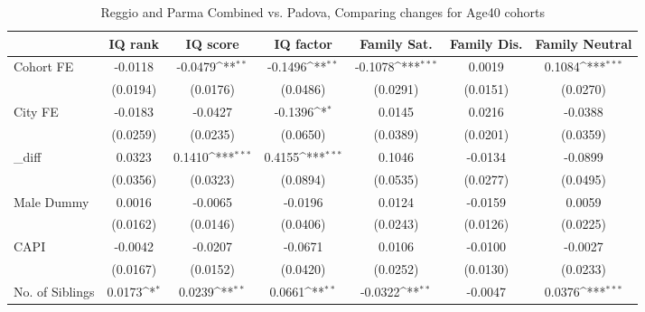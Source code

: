 \begin{table}[htbp]\centering
\def\sym#1{\ifmmode^{#1}\else\(^{#1}\)\fi}
\caption{Reggio and Parma Combined vs. Padova, Comparing changes for Age40 cohorts}
\begin{tabular}{l*{6}{c}}
\toprule
            &\multicolumn{1}{c}{IQ rank}&\multicolumn{1}{c}{IQ score}&\multicolumn{1}{c}{IQ factor}&\multicolumn{1}{c}{Family Sat.}&\multicolumn{1}{c}{Family Dis.}&\multicolumn{1}{c}{Family Neutral}\\
\midrule
Cohort FE   &     -0.0118         &     -0.0479\sym{**} &     -0.1496\sym{**} &     -0.1078\sym{***}&      0.0019         &      0.1084\sym{***}\\
            &    (0.0194)         &    (0.0176)         &    (0.0486)         &    (0.0291)         &    (0.0151)         &    (0.0270)         \\
\addlinespace
City FE     &     -0.0183         &     -0.0427         &     -0.1396\sym{*}  &      0.0145         &      0.0216         &     -0.0388         \\
            &    (0.0259)         &    (0.0235)         &    (0.0650)         &    (0.0389)         &    (0.0201)         &    (0.0359)         \\
\addlinespace
\_diff       &      0.0323         &      0.1410\sym{***}&      0.4155\sym{***}&      0.1046         &     -0.0134         &     -0.0899         \\
            &    (0.0356)         &    (0.0323)         &    (0.0894)         &    (0.0535)         &    (0.0277)         &    (0.0495)         \\
\addlinespace
Male Dummy  &      0.0016         &     -0.0065         &     -0.0196         &      0.0124         &     -0.0159         &      0.0059         \\
            &    (0.0162)         &    (0.0146)         &    (0.0406)         &    (0.0243)         &    (0.0126)         &    (0.0225)         \\
\addlinespace
CAPI        &     -0.0042         &     -0.0207         &     -0.0671         &      0.0106         &     -0.0100         &     -0.0027         \\
            &    (0.0167)         &    (0.0152)         &    (0.0420)         &    (0.0252)         &    (0.0130)         &    (0.0233)         \\
\addlinespace
No. of Siblings&      0.0173\sym{*}  &      0.0239\sym{**} &      0.0661\sym{**} &     -0.0322\sym{**} &     -0.0047         &      0.0376\sym{***}\\

\end{tabular}
\end{table}
